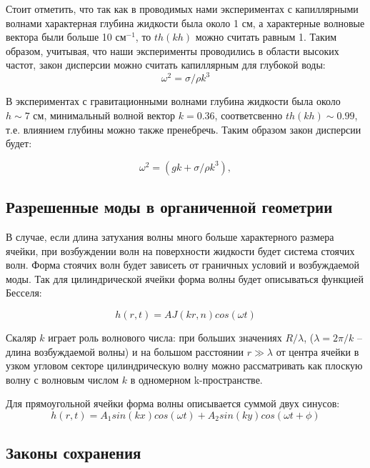 Стоит отметить, что так как в проводимых  нами экспериментах с капиллярными волнами характерная глубина жидкости была около 1 см, а характерные волновые вектора были больше 10 см$^{-1}$, то $th(kh)$ можно считать равным 1.
Таким образом, учитывая, что наши эксперименты проводились в области высоких частот, закон дисперсии можно считать капиллярным для глубокой воды:
\begin{equation}
 \label{eq:disperCap}
\omega^2 = \sigma/\rho k^3
\end{equation}

В экспериментах с гравитационными волнами глубина жидкости была около $ h \sim 7$ см, минимальный волной вектор $k = 0.36$, соответсвенно $th(kh) \sim 0.99$, т.е. влиянием глубины можно также пренебречь. Таким образом закон дисперсии будет:

\begin{equation}
 \label{eq:disperGrav}
\omega^2 = (gk + \sigma/\rho k^3),
\end{equation}

\subsection{Разрешенные моды в органиченной геометрии} \label{subsect1_geometr}
В случае, если длина затухания волны много больше характерного размера ячейки, при возбуждении волн на поверхности жидкости будет система стоячих волн. Форма стоячих волн будет зависеть от граничных условий и возбуждаемой моды.
Так для цилиндрической ячейки форма волны будет описываться функцией Бесселя:

\begin{equation}
 \label{eq:Bessel}
h(r, t) = A J(kr, n) cos(\omega t)
\end{equation}

Скаляр $k$ играет роль волнового числа: при больших значениях $R/\lambda$, ($\lambda = 2\pi/k$ – длина возбуждаемой волны) и на большом расстоянии $r \gg \lambda$ от центра ячейки в узком угловом секторе цилиндрическую волну можно рассматривать как плоскую волну с волновым числом $k$ в одномерном k-пространстве.

Для прямоугольной ячейки форма волны описывается суммой двух синусов:
\begin{equation}
 \label{eq:Bessel}
h(r, t) = A_1 sin(kx)cos(\omega t)+A_2 sin(ky)cos(\omega t+ \phi)
\end{equation}

\subsection{Законы сохранения} \label{subsect1_lawSave}

